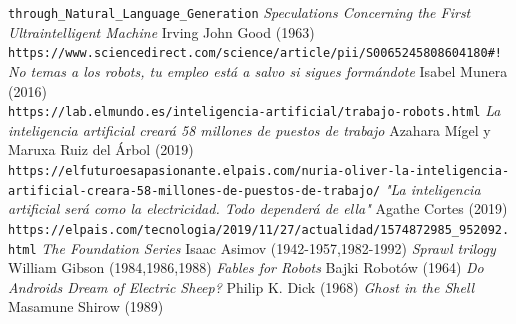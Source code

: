 \documentclass[12pt,a4paper]{article}
\begin{document}
\begin{thebibliography}{9}
\texttt{through\_Natural\_Language\_Generation}
 \textit{Speculations Concerning the First Ultraintelligent Machine} Irving John Good (1963)
\\\texttt{https://www.sciencedirect.com/science/article/pii/S0065245808604180\#!}
 \textit{No temas a los robots, tu empleo está a salvo si sigues formándote} Isabel Munera (2016)
\\\texttt{https://lab.elmundo.es/inteligencia-artificial/trabajo-robots.html}
 \textit{La inteligencia artificial creará 58 millones de puestos de trabajo} Azahara Mígel y Maruxa Ruiz del Árbol (2019)
\\\texttt{https://elfuturoesapasionante.elpais.com/nuria-oliver-la-inteligencia-}
\\\texttt{artificial-creara-58-millones-de-puestos-de-trabajo/}
 \textit{"La inteligencia artificial será como la electricidad. Todo dependerá de ella"} Agathe Cortes (2019)
\\\texttt{https://elpais.com/tecnologia/2019/11/27/actualidad/1574872985\_952092.html}
 \textit{The Foundation Series} Isaac Asimov (1942-1957,1982-1992)
 \textit{Sprawl trilogy} William Gibson (1984,1986,1988)
 \textit{Fables for Robots} Bajki Robotów (1964)
 \textit{Do Androids Dream of Electric Sheep?} Philip K. Dick (1968)
 \textit{Ghost in the Shell} Masamune Shirow (1989)
\end{thebibliography}
\end{document}
